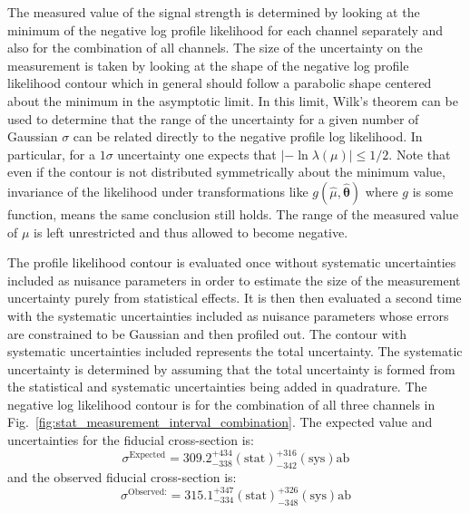 The measured value of the signal strength is determined by looking 
at the minimum 
of the negative log profile likelihood for each channel separately and also 
for the combination of all channels. The size of the uncertainty on the 
measurement is taken by looking at the shape of the negative log 
profile likelihood contour which in general should follow a parabolic
shape centered about the minimum in the asymptotic limit. In this limit,
Wilk's theorem \cite{Wilk:1938}
can be used \cite{PDG:2014}
to determine that
the range of the 
uncertainty for a given number of Gaussian $\sigma$ can be related
directly 
to the negative profile log likelihood.  In particular, for 
a $1\sigma$ uncertainty one expects that 
$|-\ln \lambda(\mu)| \leq 1/2$.
Note that even if the contour is not distributed symmetrically about 
the minimum
value, invariance of the likelihood under 
transformations like $g(\hat{\mu},\hat{\boldsymbol{\theta}})$ where $g$ is some function, 
means the same conclusion still holds.
The range of the measured value of $\mu$ is left unrestricted and thus
allowed to become negative.

The profile likelihood contour is evaluated once without 
systematic uncertainties included
as nuisance parameters in order to estimate the size of the 
measurement uncertainty purely 
from statistical effects. It is then then evaluated a second time with the 
systematic uncertainties included
as nuisance parameters whose errors are constrained to be Gaussian and then 
profiled out. The contour with systematic uncertainties included represents
the total uncertainty. The systematic uncertainty is determined by 
assuming that
the total uncertainty is formed from the statistical and systematic 
uncertainties being added
in quadrature.
The negative log likelihood contour is 
for the combination of all three channels in 
Fig.~\ref{fig:stat_measurement_interval_combination}.
The expected value and uncertainties for the fiducial cross-section is:
\begin{equation}
\sigma^{\textrm{Expected}} = 309.2  ^{+434}_{-338} (\textrm{stat}) ^{+316}_{-342} (\textrm{sys}) \textrm{ab}
\end{equation}
and the observed fiducial cross-section is:
\begin{equation}
\sigma^{\textrm{Observed:}} = 315.1  ^{+347}_{-334} (\textrm{stat}) ^{+326}_{-348} (\textrm{sys}) \textrm{ab}
\end{equation}

